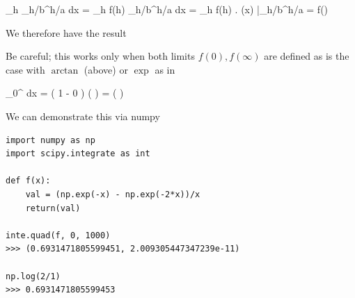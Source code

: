 \bee
\lim_{h \rightarrow \infty} \int_{h/b}^{h/a}  dx = \lim_{h \rightarrow \infty} f(h) \int_{h/b}^{h/a}  dx =  \lim_{h \rightarrow \infty} f(h) \left. \log(x) \right|_{h/b}^{h/a} = f(\infty) \log {}
\eee

We therefore have the result

\bee
{}
\eee

Be careful; this works only when both limits $f(0), f(\infty)$ are defined as is the case with $\arctan$ (above) or $\exp$ as in

\bee
  \int_0^\infty {} dx = \left( 1 - 0 \right) \log \left(  \right) = \log \left(  \right)
\eee

We can demonstrate this via numpy

\begin{verbatim}
import numpy as np
import scipy.integrate as int

def f(x):
    val = (np.exp(-x) - np.exp(-2*x))/x
    return(val)

inte.quad(f, 0, 1000)
>>> (0.6931471805599451, 2.009305447347239e-11)

np.log(2/1)
>>> 0.6931471805599453
\end{verbatim}


